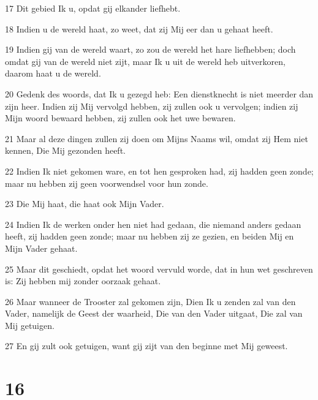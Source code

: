 \par 17 Dit gebied Ik u, opdat gij elkander liefhebt.
\par 18 Indien u de wereld haat, zo weet, dat zij Mij eer dan u gehaat heeft.
\par 19 Indien gij van de wereld waart, zo zou de wereld het hare liefhebben; doch omdat gij van de wereld niet zijt, maar Ik u uit de wereld heb uitverkoren, daarom haat u de wereld.
\par 20 Gedenk des woords, dat Ik u gezegd heb: Een dienstknecht is niet meerder dan zijn heer. Indien zij Mij vervolgd hebben, zij zullen ook u vervolgen; indien zij Mijn woord bewaard hebben, zij zullen ook het uwe bewaren.
\par 21 Maar al deze dingen zullen zij doen om Mijns Naams wil, omdat zij Hem niet kennen, Die Mij gezonden heeft.
\par 22 Indien Ik niet gekomen ware, en tot hen gesproken had, zij hadden geen zonde; maar nu hebben zij geen voorwendsel voor hun zonde.
\par 23 Die Mij haat, die haat ook Mijn Vader.
\par 24 Indien Ik de werken onder hen niet had gedaan, die niemand anders gedaan heeft, zij hadden geen zonde; maar nu hebben zij ze gezien, en beiden Mij en Mijn Vader gehaat.
\par 25 Maar dit geschiedt, opdat het woord vervuld worde, dat in hun wet geschreven is: Zij hebben mij zonder oorzaak gehaat.
\par 26 Maar wanneer de Trooster zal gekomen zijn, Dien Ik u zenden zal van den Vader, namelijk de Geest der waarheid, Die van den Vader uitgaat, Die zal van Mij getuigen.
\par 27 En gij zult ook getuigen, want gij zijt van den beginne met Mij geweest.

\chapter{16}

